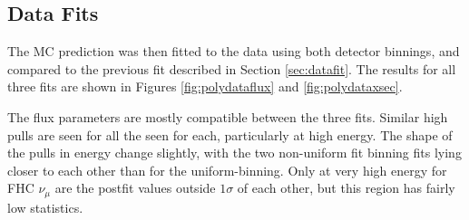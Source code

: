 \subsection{Data Fits}

The MC prediction was then fitted to the data using both detector binnings, and compared to the previous fit described in Section \ref{sec:datafit}. The results for all three fits are shown in Figures \ref{fig:polydataflux} and \ref{fig:polydataxsec}. 

The flux parameters are mostly compatible between the three fits. Similar high pulls are seen for all the seen for each, particularly at high energy. The shape of the pulls in energy change slightly, with the two non-uniform fit binning fits lying closer to each other than for the uniform-binning. Only at very high energy for FHC $\nu_{\mu}$ are the postfit values outside $1\sigma$ of each other, but this region has fairly low statistics.

